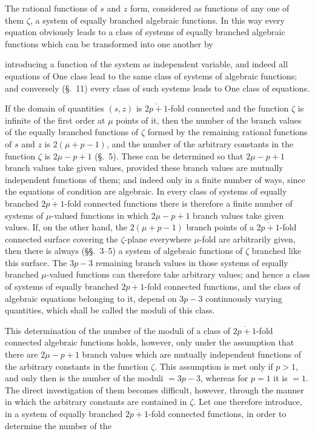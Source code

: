 \documentclass{article}
\begin{document}
The rational functions of $s$ and $z$ form, considered as functions of any one of them $\zeta$, a system of equally branched algebraic functions. In this way every equation obviously leads to a class of systems of equally branched algebraic functions which can be transformed into one another by

introducing a function of the system as independent variable, and indeed all equations of One class lead to the same class of systems of algebraic functions; and conversely (§.~11) every class of such systems leads to One class of equations.

If the domain of quantities $(s, z)$ is $\overline{2p+1}$-fold connected and the function $\zeta$ is infinite of the first order at $\mu$ points of it, then the number of the branch values of the equally branched functions of $\zeta$ formed by the remaining rational functions of $s$ and $z$ is $2(\mu+p-1)$, and the number of the arbitrary constants in the function $\zeta$ is $2\mu-p+1$ (§.~5). These can be determined so that $2\mu-p+1$ branch values take given values, provided these branch values are mutually independent functions of them; and indeed only in a finite number of ways, since the equations of condition are algebraic. In every class of systems of equally branched $\overline{2p+1}$-fold connected functions there is therefore a finite number of systems of $\mu$-valued functions in which $2\mu-p+1$ branch values take given values. If, on the other hand, the $2(\mu+p-1)$ branch points of a $\overline{2p+1}$-fold connected surface covering the $\zeta$-plane everywhere $\mu$-fold are arbitrarily given, then there is always (§§.~3–5) a system of algebraic functions of $\zeta$ branched like this surface. The $3p-3$ remaining branch values in those systems of equally branched $\mu$-valued functions can therefore take arbitrary values; and hence a class of systems of equally branched $\overline{2p+1}$-fold connected functions, and the class of algebraic equations belonging to it, depend on $3p-3$ continuously varying quantities, which shall be called the moduli of this class.

This determination of the number of the moduli of a class of $\overline{2p+1}$-fold connected algebraic functions holds, however, only under the assumption that there are $2\mu-p+1$ branch values which are mutually independent functions of the arbitrary constants in the function $\zeta$. This assumption is met only if $p > 1$, and only then is the number of the moduli $= 3p-3$, whereas for $p = 1$ it is $= 1$. The direct investigation of them becomes difficult, however, through the manner in which the arbitrary constants are contained in $\zeta$. Let one therefore introduce, in a system of equally branched $\overline{2p+1}$-fold connected functions, in order to determine the number of the
\end{document}
